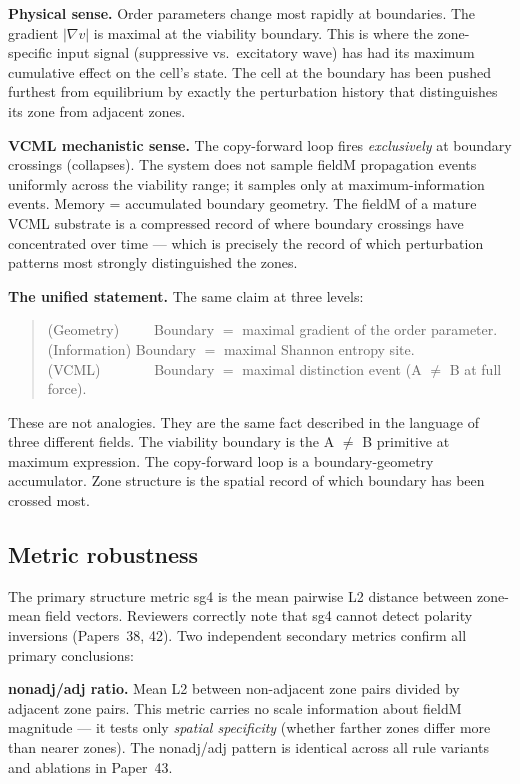 \documentclass[11pt]{article}
\begin{document}
\textbf{Physical sense.}
Order parameters change most rapidly at boundaries.
The gradient $|\nabla v|$ is maximal at the viability boundary.
This is where the zone-specific input signal (suppressive vs.\ excitatory wave) has had
its maximum cumulative effect on the cell's state.
The cell at the boundary has been pushed furthest from equilibrium by exactly the
perturbation history that distinguishes its zone from adjacent zones.

\textbf{VCML mechanistic sense.}
The copy-forward loop fires \emph{exclusively} at boundary crossings (collapses).
The system does not sample fieldM propagation events uniformly across the viability range;
it samples only at maximum-information events.
Memory = accumulated boundary geometry.
The fieldM of a mature VCML substrate is a compressed record of where boundary crossings
have concentrated over time --- which is precisely the record of which perturbation
patterns most strongly distinguished the zones.

\textbf{The unified statement.}
The same claim at three levels:
\begin{quote}
  (Geometry)\ \ \ \ \, Boundary $= $ maximal gradient of the order parameter.\\
  (Information) Boundary $= $ maximal Shannon entropy site.\\
  (VCML) \ \ \ \ \ \ \ Boundary $= $ maximal distinction event (A $\neq$ B at full force).
\end{quote}
These are not analogies.
They are the same fact described in the language of three different fields.
The viability boundary is the A $\neq$ B primitive at maximum expression.
The copy-forward loop is a boundary-geometry accumulator.
Zone structure is the spatial record of which boundary has been crossed most.

\subsection{Metric robustness}

The primary structure metric sg4 is the mean pairwise L2 distance between zone-mean
field vectors.
Reviewers correctly note that sg4 cannot detect polarity inversions (Papers~38, 42).
Two independent secondary metrics confirm all primary conclusions:

\textbf{nonadj/adj ratio.}
Mean L2 between non-adjacent zone pairs divided by adjacent zone pairs.
This metric carries no scale information about fieldM magnitude --- it tests only
\emph{spatial specificity} (whether farther zones differ more than nearer zones).
The nonadj/adj pattern is identical across all rule variants and ablations in Paper~43.
\end{document}
